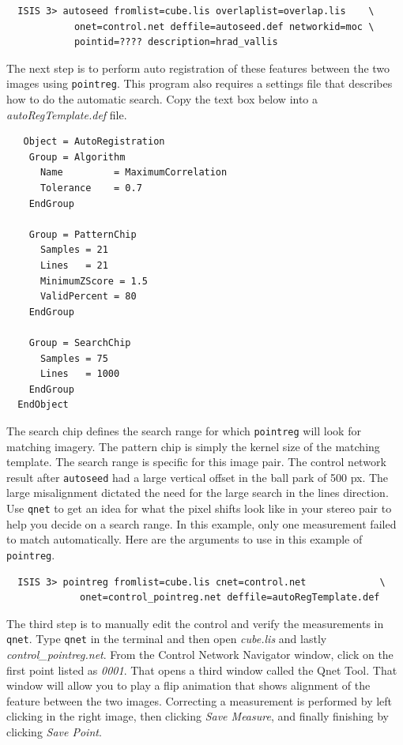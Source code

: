\begin{verbatim}
  ISIS 3> autoseed fromlist=cube.lis overlaplist=overlap.lis    \
            onet=control.net deffile=autoseed.def networkid=moc \
            pointid=???? description=hrad_vallis
\end{verbatim}

The next step is to perform auto registration of these features
between the two images using \texttt{pointreg}. This program also
requires a settings file that describes how to do the automatic
search. Copy the text box below into a \textit{autoRegTemplate.def}
file.

\begin{verbatim}
   Object = AutoRegistration
    Group = Algorithm
      Name         = MaximumCorrelation
      Tolerance    = 0.7
    EndGroup

    Group = PatternChip
      Samples = 21
      Lines   = 21
      MinimumZScore = 1.5
      ValidPercent = 80
    EndGroup

    Group = SearchChip
      Samples = 75
      Lines   = 1000
    EndGroup
  EndObject
\end{verbatim}

The search chip defines the search range for which \texttt{pointreg}
will look for matching imagery. The pattern chip is simply the kernel
size of the matching template. The search range is specific for this
image pair. The control network result after \texttt{autoseed} had a
large vertical offset in the ball park of 500 px. The large
misalignment dictated the need for the large search in the lines
direction. Use \texttt{qnet} to get an idea for what the pixel shifts
look like in your stereo pair to help you decide on a search range. In
this example, only one measurement failed to match automatically. Here
are the arguments to use in this example of \texttt{pointreg}.

\begin{verbatim}
  ISIS 3> pointreg fromlist=cube.lis cnet=control.net             \
             onet=control_pointreg.net deffile=autoRegTemplate.def
\end{verbatim}

The third step is to manually edit the control and verify the
measurements in \texttt{qnet}. Type \texttt{qnet} in the terminal and
then open \textit{cube.lis} and lastly
\textit{control\_pointreg.net}. From the Control Network Navigator
window, click on the first point listed as \textit{0001}. That opens a
third window called the Qnet Tool. That window will allow you to play
a flip animation that shows alignment of the feature between the two
images. Correcting a measurement is performed by left clicking in the
right image, then clicking \textit{Save Measure}, and finally
finishing by clicking \textit{Save Point}.

